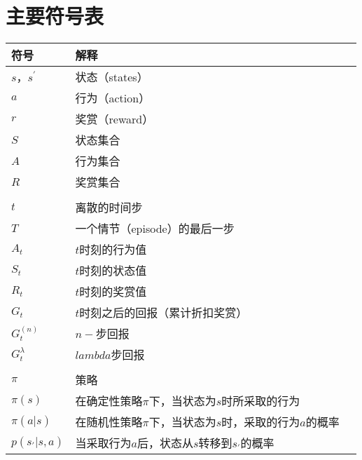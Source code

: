 \chapter{主要符号表}
\begin{longtable}{|l|l|l|}
 \hline
 符号 & 解释 \\
 \hline
$s$，$s^{'} $                           & 状态（states）               \\
$a$                            & 行为（action）                \\
$r$                           & 奖赏（reward）                  \\
$S$                            & 状态集合\\
$A$                            & 行为集合                             \\
$R$                            & 奖赏集合                                    \\
                            &                                         \\
$t$                            & 离散的时间步                                    \\
$T$                            & 一个情节（episode）的最后一步              \\
$A_{t}$                            & $t$时刻的行为值              \\
$S_{t}$                          & $t$时刻的状态值                    \\
$R_{t}$                           & $t$时刻的奖赏值                               \\
$G_{t}$                            & $t$时刻之后的回报（累计折扣奖赏）    \\
$G_{t}^{(n)}$                            & $n-$步回报    \\
$G_{t}^{\lambda}$                            & $lambda$步回报    \\
                            &                        \\
$\pi$                            & 策略                                              \\
$\pi(s)$     & 在确定性策略$\pi$下，当状态为$s$时所采取的行为                 \\
$\pi(a|s)$      & 在随机性策略$\pi$下，当状态为$s$时，采取的行为$a$的概率                 \\
$p(s_{'}|s,a)$      & 当采取行为$a$后，状态从$s$转移到$s_{'}$的概率  \\

\end{longtable}
